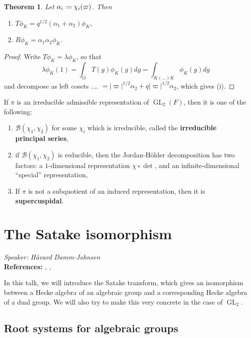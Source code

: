 \documentclass[11pt]{report}
\let\mc\mathcal
\newcommand{\1}{\mathbbm 1}
\newcommand*{\defeq}{\mathrel{\vcenter{\baselineskip0.5ex \lineskiplimit0pt
      \hbox{\scriptsize.}\hbox{\scriptsize.}}}%
  =}
\DeclareMathOperator{\GL}{GL}
\theoremstyle{plain}
\newtheorem{thm}{Theorem}[section]
\newcounter{ex}
\theoremstyle{definition}
\theoremstyle{remark}
\numberwithin{equation}{section}
\begin{document}
\begin{thm}
  Let $\alpha_{i} \defeq \chi_{i}(\varpi)$. Then
  \begin{enumerate}
  \item $T\phi_{K} = q^{1/2}(\alpha_{1}+\alpha_{2})\phi_{K}$,
  \item $R\phi_{K} = \alpha_{1}\alpha_{2}\phi_{K}$.
  \end{enumerate}
\end{thm}
\begin{proof}
  Write $T\phi_{K} = \lambda \phi_{K}$, so that
  \begin{equation}
    \label{eq:11}
    \lambda \phi_{K}(1) = \int_{G}T(g)\phi_{K}(g)dg = \int_{K(...)K}\phi_{K}(g)dg
  \end{equation}
  and decompose as left cosets .... $= |\varpi|^{1/2}\alpha_{2} +
  q|\varpi|^{1/2}\alpha_{2}$, which gives (i).
\end{proof}

If $\pi$ is an irreducible admissible representation of $\GL_{2}(F)$,
then it is one of the following:
\begin{enumerate}
\item $\mc B(\chi_{1},\chi_{2})$ for some $\chi_{i}$ which is irreducible, called the
  \textbf{irreducible principal series},
\item if $\mc B(\chi_{1},\chi_{2})$ is reducible, then the Jordan-H\"older
  decomposition has two factors: a $1$-dimensional
  representation $\chi \circ \det$, and an infinite-dimensional ``special''
  representation,
\item If $\pi$ is not a subquotient of an induced representation, then
  it is \textbf{supercuspidal}.
\end{enumerate}

\section{The Satake isomorphism}
\label{sec:satake}
\emph{Speaker: Håvard Damm-Johnsen}\\ 

\textbf{References:} \cite{cogdell2004}, \cite[\S 2]{getz2010}, 

In this talk, we will introduce the Satake transform, which gives an
isomorphism between a Hecke algebra of an algebraic group and a
corresponding Hecke algebra of a dual group. We will also try to make
this very concrete in the case of $\GL_2$.

\subsection{Root systems for algebraic groups}
\label{sec:root-sys}
\end{document}
